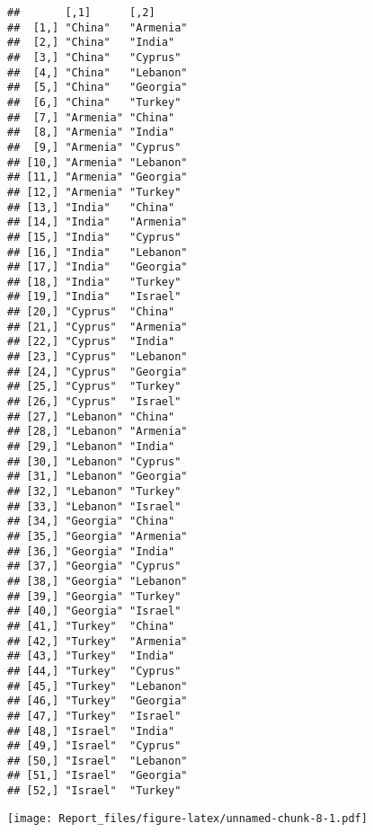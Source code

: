 \documentclass[
]{article}
\newenvironment{Shaded}{\begin{snugshade}}{\end{snugshade}}
\newcommand{\AttributeTok}[1]{\textcolor[rgb]{0.13,0.29,0.53}{#1}}
\newcommand{\CommentTok}[1]{\textcolor[rgb]{0.56,0.35,0.01}{\textit{#1}}}
\newcommand{\DecValTok}[1]{\textcolor[rgb]{0.00,0.00,0.81}{#1}}
\newcommand{\FloatTok}[1]{\textcolor[rgb]{0.00,0.00,0.81}{#1}}
\newcommand{\FunctionTok}[1]{\textcolor[rgb]{0.13,0.29,0.53}{\textbf{#1}}}
\newcommand{\NormalTok}[1]{#1}
\newcommand{\SpecialCharTok}[1]{\textcolor[rgb]{0.81,0.36,0.00}{\textbf{#1}}}
\newcommand{\StringTok}[1]{\textcolor[rgb]{0.31,0.60,0.02}{#1}}
\begin{document}
\begin{verbatim}
##       [,1]      [,2]     
##  [1,] "China"   "Armenia"
##  [2,] "China"   "India"  
##  [3,] "China"   "Cyprus" 
##  [4,] "China"   "Lebanon"
##  [5,] "China"   "Georgia"
##  [6,] "China"   "Turkey" 
##  [7,] "Armenia" "China"  
##  [8,] "Armenia" "India"  
##  [9,] "Armenia" "Cyprus" 
## [10,] "Armenia" "Lebanon"
## [11,] "Armenia" "Georgia"
## [12,] "Armenia" "Turkey" 
## [13,] "India"   "China"  
## [14,] "India"   "Armenia"
## [15,] "India"   "Cyprus" 
## [16,] "India"   "Lebanon"
## [17,] "India"   "Georgia"
## [18,] "India"   "Turkey" 
## [19,] "India"   "Israel" 
## [20,] "Cyprus"  "China"  
## [21,] "Cyprus"  "Armenia"
## [22,] "Cyprus"  "India"  
## [23,] "Cyprus"  "Lebanon"
## [24,] "Cyprus"  "Georgia"
## [25,] "Cyprus"  "Turkey" 
## [26,] "Cyprus"  "Israel" 
## [27,] "Lebanon" "China"  
## [28,] "Lebanon" "Armenia"
## [29,] "Lebanon" "India"  
## [30,] "Lebanon" "Cyprus" 
## [31,] "Lebanon" "Georgia"
## [32,] "Lebanon" "Turkey" 
## [33,] "Lebanon" "Israel" 
## [34,] "Georgia" "China"  
## [35,] "Georgia" "Armenia"
## [36,] "Georgia" "India"  
## [37,] "Georgia" "Cyprus" 
## [38,] "Georgia" "Lebanon"
## [39,] "Georgia" "Turkey" 
## [40,] "Georgia" "Israel" 
## [41,] "Turkey"  "China"  
## [42,] "Turkey"  "Armenia"
## [43,] "Turkey"  "India"  
## [44,] "Turkey"  "Cyprus" 
## [45,] "Turkey"  "Lebanon"
## [46,] "Turkey"  "Georgia"
## [47,] "Turkey"  "Israel" 
## [48,] "Israel"  "India"  
## [49,] "Israel"  "Cyprus" 
## [50,] "Israel"  "Lebanon"
## [51,] "Israel"  "Georgia"
## [52,] "Israel"  "Turkey"
\end{verbatim}

\begin{Shaded}
\end{Shaded}

\texttt{[image: Report\_files/figure-latex/unnamed-chunk-8-1.pdf]}
\end{document}
